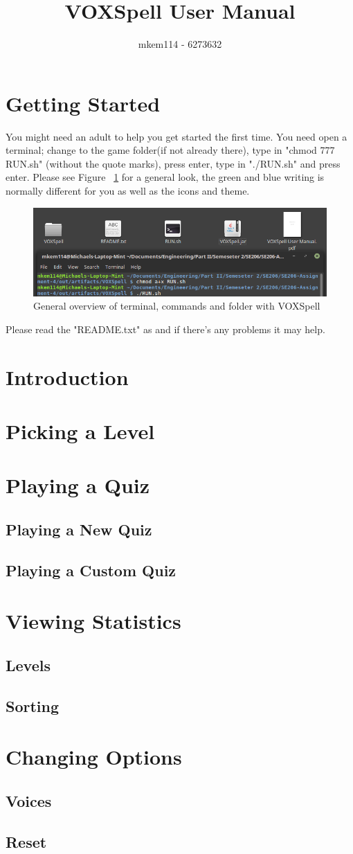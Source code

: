 \documentclass[12pt,a4paper,titlepage,onecolumn]{article}
\author{mkem114 - 6273632}
\title{VOXSpell User Manual}
\begin{document}
	\maketitle
	\tableofcontents
	\listoffigures
	
	\section{Getting Started}
	You might need an adult to help you get started the first time. You need open a terminal; change to the game folder(if not already there), type in "chmod 777 RUN.sh" (without the quote marks), press enter, type in "./RUN.sh" and press enter. Please see Figure ~\ref{fig:TerminalandFolder} for a general look, the green and blue writing is normally different for you as well as the icons and theme.
	\begin{figure}[h]
	\centering
	\includegraphics[width=0.7\linewidth]{"Figures/Getting Started/TerminalandFolder"}
	\caption[Terminal commands]{General overview of terminal, commands and folder with VOXSpell}
	\label{fig:TerminalandFolder}
	\end{figure}
	Please read the "README.txt" as and if there's any problems it may help.
	
	\section{Introduction}
	\section{Picking a Level}
	\section{Playing a Quiz}
		\subsection{Playing a New Quiz}
		\subsection{Playing a Custom Quiz}
	\section{Viewing Statistics}
		\subsection{Levels}
		\subsection{Sorting}
	\section{Changing Options}
		\subsection{Voices}
		\subsection{Reset}
		
\end{document}
